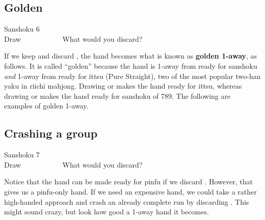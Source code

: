 \newpage
\subsection{Golden}\label{sec:san6}
\begin{itembox}[r]{{\jap Sanshoku} 6}
\bp
{}~\\
\hfill\footnotesize{Draw~~~~~~~~~~~}
\ep
\vspace{-17pt}What would you discard? \vspace{-5pt}
\end{itembox}
\noindent
If we keep {\LARGE{}} and discard {\LARGE{}}, the hand becomes what is known as {\bf golden 1-away}, as follows.
\bp
{}
\ep {}
It is called ``golden'' because the hand is 1-away from ready for {\jap sanshoku} \emph{and} 1-away from ready for {\jap ittsu} (Pure Straight), two of the most popular two-{\jap han yaku} in riichi mahjong. 
Drawing {\LARGE{}} or {\LARGE{}} makes the hand ready for {\jap ittsu}, whereas drawing {\LARGE{}} or {\LARGE{}} makes the hand ready for {\jap sanshoku} of 789. The following are examples of golden 1-away.
\bp
{}\fa\fa\\
\ep

\newpage
\subsection{Crashing a group}\label{sec:san7}
\begin{itembox}[r]{{\jap Sanshoku} 7}
\bp
{}~\\
\hfill\footnotesize{Draw~~~~~~~~~~~}
\ep
\vspace{-15pt}What would you discard? \vspace{-5pt}
\end{itembox}
\noindent
Notice that the hand can be made ready for {\jap pinfu} if we discard {\LARGE{}}. However, that gives us a {\jap pinfu}-only hand. If we need an expensive hand, we could take a rather high-handed approach and crash an already complete run by discarding {\LARGE{}}. This might sound crazy, but look how good a 1-away hand it becomes.

